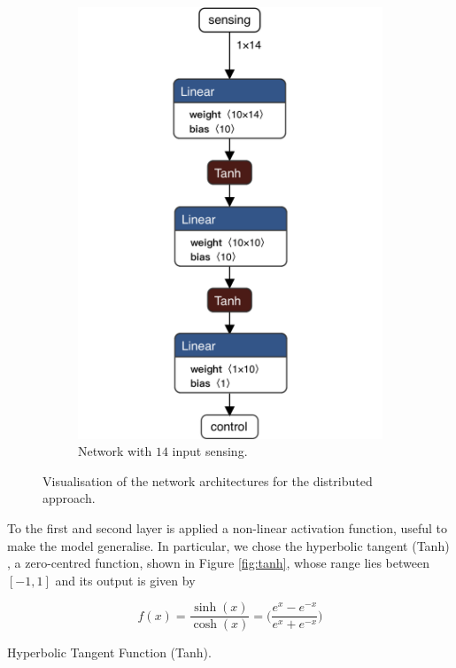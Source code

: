 \begin{figure}[htb]
\begin{subfigure}[h]{0.495\textwidth}
		\includegraphics[width=.8\textwidth]{contents/images/task1distributed_all@4x}
		\caption{Network with $14$ input sensing.}
		\label{fig:singlenet14distributed1}
	\end{subfigure}
	\caption[Network architectures for the distributed approach.]{Visualisation of 
	the network architectures for the distributed approach.}
	\label{fig:singlenetdistributed1}
\end{figure}
To the first and second layer is applied a non-linear activation function, 
useful to make the model generalise. 
In particular, we chose the hyperbolic tangent (Tanh) 
\cite[see][]{kalman1992tanh}, a zero-centred function, shown in Figure 
\ref{fig:tanh}, whose range lies between $[-1, 1]$ and its output is given by

\begin{Equation}[H]
	\centering
	\begin{equation}
	f(x)= \frac{\sinh (x)}{\cosh (x)} = \bigg( \frac{e^x - e^{-x}}{e^x + 
		e^{-x}}\bigg)
	\end{equation}
	\caption{Hyperbolic Tangent Function (Tanh).}
	\label{eq:tanh}
\end{Equation}

